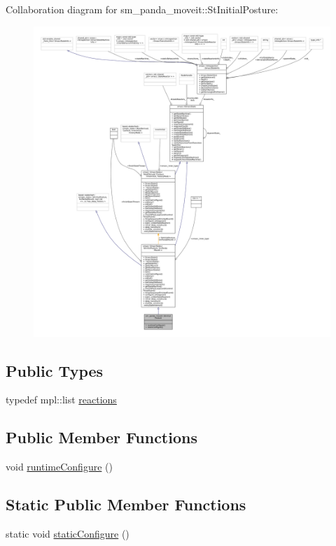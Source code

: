 Collaboration diagram for sm\+\_\+panda\+\_\+moveit\+:\+:St\+Initial\+Posture\+:
\nopagebreak
\begin{figure}[H]
\begin{center}
\leavevmode
\includegraphics[width=350pt]{structsm__panda__moveit_1_1StInitialPosture__coll__graph}
\end{center}
\end{figure}
\subsection*{Public Types}
\begin{DoxyCompactItemize}
\item 
typedef mpl\+::list \hyperlink{structsm__panda__moveit_1_1StInitialPosture_a5646a5be24f1405d92e66c5752eebb56}{reactions}
\end{DoxyCompactItemize}
\subsection*{Public Member Functions}
\begin{DoxyCompactItemize}
\item 
void \hyperlink{structsm__panda__moveit_1_1StInitialPosture_a09434d5d4661fe873929451d01c86c07}{runtime\+Configure} ()
\end{DoxyCompactItemize}
\subsection*{Static Public Member Functions}
\begin{DoxyCompactItemize}
\item 
static void \hyperlink{structsm__panda__moveit_1_1StInitialPosture_a8b2efaff20ee8fd624bb0d7b29b124b4}{static\+Configure} ()
\end{DoxyCompactItemize}
